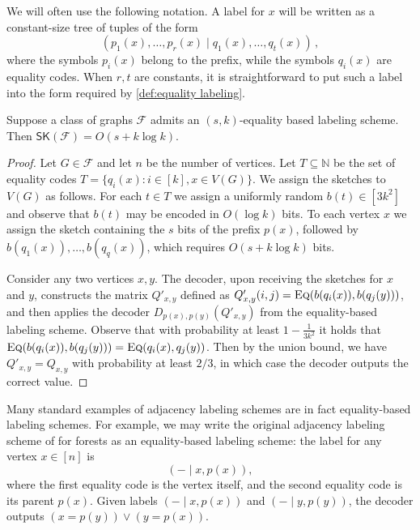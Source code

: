 \documentclass{article}
\newcommand\eqLabelSep{\mathbin|}
\newcommand{\cF}{\ensuremath{\mathcal{F}}}
\newcommand{\bN}{\ensuremath{\mathbb{N}}}
\newcommand{\Eq}{\textsc{Eq}}
\newcommand{\RL}{\mathsf{SK}}
\begin{document}
\begin{remark}\label{rm:conv-form}
We will often use the following notation. A label for $x$ will be written as a constant-size tree of
tuples of the form
\[
  (p_1(x), \dotsc, p_r(x) \eqLabelSep q_1(x), \dotsc, q_t(x) ) \,,
\]
where the symbols $p_i(x)$ belong to the prefix, while the symbols $q_i(x)$ are equality codes. When
$r,t$ are constants, 
it is straightforward to
put such a label into the form required by \cref{def:equality labeling}.
\end{remark}

\begin{proposition}
\label{prop:eq-label-to-sk}
Suppose a class of graphs $\cF$ admits an $(s,k)$-equality based labeling scheme. Then
$\RL(\cF) = O(s + k \log k)$.
\end{proposition}
\begin{proof}
Let $G \in \cF$ and let $n$ be the number of vertices. Let $T \subseteq \bN$ be the set of equality
codes $T = \{ q_i(x) : i \in [k], x \in V(G) \}$. We assign the sketches to $V(G)$ as
follows. For each $t \in T$ we assign a uniformly random $b(t) \in [3k^2]$ and observe that $b(t)$
may be encoded in $O(\log k)$ bits. To each vertex $x$ we assign the sketch
containing the $s$ bits of the prefix $p(x)$, followed by $b(q_1(x)), \dotsc, b(q_q(x))$, which
requires $O(s + k \log k)$ bits.

Consider any two vertices $x,y$. The decoder, upon receiving the sketches for $x$ and $y$,
constructs the matrix $Q'_{x,y}$ defined as $Q'_{x,y}(i,j) = \Eq(b(q_i(x)), b(q_j(y)))$, and then
applies the decoder $D_{p(x),p(y)}(Q'_{x,y})$ from the equality-based labeling scheme.  Observe that with probability at least $1 - \frac{1}{3k^2}$ it holds that
$\Eq(b(q_i(x)), b(q_j(y)))  = \Eq(q_i(x), q_j(y))$.
Then by the union bound, we have $Q'_{x,y} = Q_{x,y}$ with probability at least $2/3$, in which
case the decoder outputs the correct value.
\end{proof}

\begin{example}
\label{example:forests}
Many standard examples of adjacency labeling schemes are in fact equality-based labeling schemes.
For example, we may write the original adjacency labeling scheme of \cite{KNR92} for forests as an
equality-based labeling scheme: the label for any vertex $x \in [n]$ is
\[
  ( - \mid x, p(x) ),
\]
where the first equality code is the vertex itself, and the second equality code is its parent $p(x)$. Given labels $( - \mid x, p(x))$ and $( - \mid y, p(y))$,
the decoder outputs $(x = p(y)) \vee (y = p(x))$.
\end{example}
\end{document}
